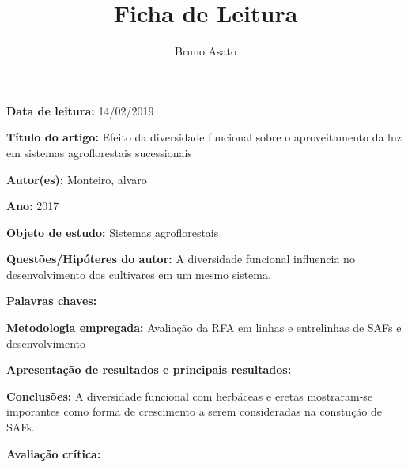 \documentclass[12pt,a4paper]{article}
\title{Ficha de Leitura}
\author{Bruno Asato}
\begin{document}

\textbf{Data de leitura:} 14/02/2019

\textbf{Título do artigo:} Efeito da diversidade funcional sobre o aproveitamento
da luz em sistemas agroflorestais sucessionais

\textbf{Autor(es):} Monteiro, alvaro

\textbf{Ano:} 2017

\textbf{Objeto de estudo:} Sistemas agroflorestais

\textbf{Questões/Hipóteres do autor:} A diversidade funcional influencia no desenvolvimento dos cultivares em um mesmo sistema.

\textbf{Palavras chaves:}

\textbf{Metodologia empregada:} Avaliação da RFA em linhas e entrelinhas de SAFs e desenvolvimento 

\textbf{Apresentação de resultados e principais resultados:}

\textbf{Conclusões:} A diversidade funcional com herbáceas e eretas mostraram-se imporantes como forma de crescimento a serem consideradas na constução de SAFs.

\textbf{Avaliação crítica:}
\end{document}
